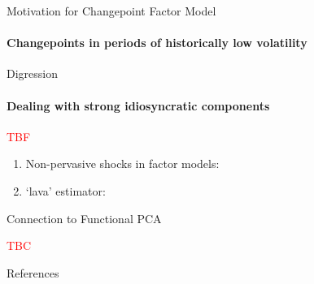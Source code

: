 \documentclass{beamer}
\begin{document}

\begin{frame}{Motivation for Changepoint Factor Model}
\framesubtitle{Changepoints in periods of historically low volatility}

\begin{figure}[h]
	\centering
\end{figure}

\end{frame}




\begin{frame}{Digression}
\framesubtitle{Dealing with strong idiosyncratic components}

\textcolor{red}{TBF}

\begin{enumerate}
    \item Non-pervasive shocks in factor models: \cite{luciani2014forecasting}
    \item `lava' estimator: \cite{chernozhukov2017lava}
\end{enumerate}

\end{frame}




\begin{frame}{Connection to Functional PCA}
    
    \textcolor{red}{TBC}
    
\end{frame}



\begin{frame}{References}


\end{frame}
\end{document}
